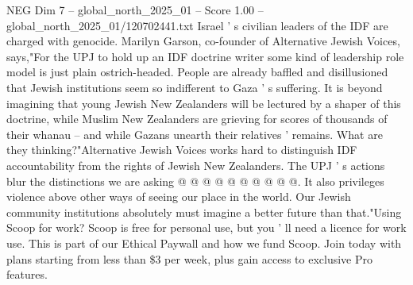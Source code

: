 \begin{textsample}{NEG Dim 7 – global\_north\_2025\_01 – Score 1.00 – global\_north\_2025\_01/120702441.txt}
Israel ' s civilian leaders of the IDF are charged with genocide.
Marilyn Garson, co-founder of Alternative Jewish Voices, says,"For the UPJ to hold up an IDF doctrine writer some kind of leadership role model is just plain ostrich-headed.
People are already baffled and disillusioned that Jewish institutions seem so indifferent to Gaza ' s suffering.
It is beyond imagining that young Jewish New Zealanders will be lectured by a shaper of this doctrine, while Muslim New Zealanders are grieving for scores of thousands of their whanau -- and while Gazans unearth their relatives ' remains.
What are they thinking?"Alternative Jewish Voices works hard to distinguish IDF accountability from the rights of Jewish New Zealanders.
The UPJ ' s actions blur the distinctions we are asking @ @ @ @ @ @ @ @ @ @.
It also privileges violence above other ways of seeing our place in the world.
Our Jewish community institutions absolutely must imagine a better future than that."Using Scoop for work?
Scoop is free for personal use, but you ' ll need a licence for work use.
This is part of our Ethical Paywall and how we fund Scoop.
Join today with plans starting from less than \$3 per week, plus gain access to exclusive Pro features.

\end{textsample}
